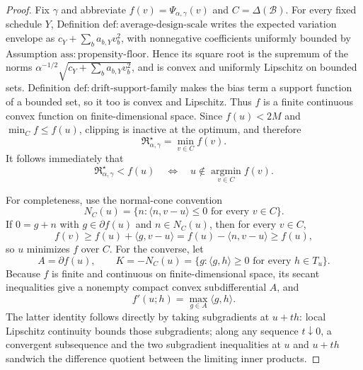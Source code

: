 \documentclass{article}
\begin{document}
\begin{proof}
Fix \(\gamma\) and abbreviate \(f(v)=\Psi_{\alpha,\gamma}(v)\) and \(C=\Delta(\mathcal B)\).  For every fixed schedule \(Y\), Definition \(\mathrm{def:average\text{-}design\text{-}scale}\) writes the expected variation envelope as \(c_Y+\sum_ba_{b,Y}v_b^2\), with nonnegative coefficients uniformly bounded by Assumption \(\mathrm{ass:propensity\text{-}floor}\).  Hence its square root is the supremum of the norms
\(\alpha^{-1/2}\sqrt{c_Y+\sum_ba_{b,Y}v_b^2}\), and is convex and uniformly Lipschitz on bounded sets.  Definition \(\mathrm{def:drift\text{-}support\text{-}family}\) makes the bias term a support function of a bounded set, so it too is convex and Lipschitz.  Thus \(f\) is a finite continuous convex function on finite-dimensional space.  Since \(f(u)<2M\) and \(\min_Cf\le f(u)\), clipping is inactive at the optimum, and therefore
\[
\mathfrak R_{\alpha,\gamma}^\star=\min_{v\in C}f(v).
\]
It follows immediately that
\[
\mathfrak R_{\alpha,\gamma}^\star<f(u)
\quad\Longleftrightarrow\quad
u\notin\operatorname*{argmin}_{v\in C}f(v).
\]

For completeness, use the normal-cone convention
\[
N_C(u)=\{n:\langle n,v-u\rangle\le0\text{ for every }v\in C\}.
\]
If \(0=g+n\) with \(g\in\partial f(u)\) and \(n\in N_C(u)\), then for every \(v\in C\),
\[
f(v)\ge f(u)+\langle g,v-u\rangle
=f(u)-\langle n,v-u\rangle\ge f(u),
\]
so \(u\) minimizes \(f\) over \(C\).  For the converse, let
\[
A=\partial f(u),
\qquad
K=-N_C(u)=\{g:\langle g,h\rangle\ge0\text{ for every }h\in T_u\}.
\]
Because \(f\) is finite and continuous on finite-dimensional space, its secant inequalities give a nonempty compact convex subdifferential \(A\), and
\[
f'(u;h)=\max_{g\in A}\langle g,h\rangle.
\]
The latter identity follows directly by taking subgradients at \(u+t h\): local Lipschitz continuity bounds those subgradients; along any sequence \(t\downarrow0\), a convergent subsequence and the two subgradient inequalities at \(u\) and \(u+t h\) sandwich the difference quotient between the limiting inner products.


\end{proof}
\end{document}
